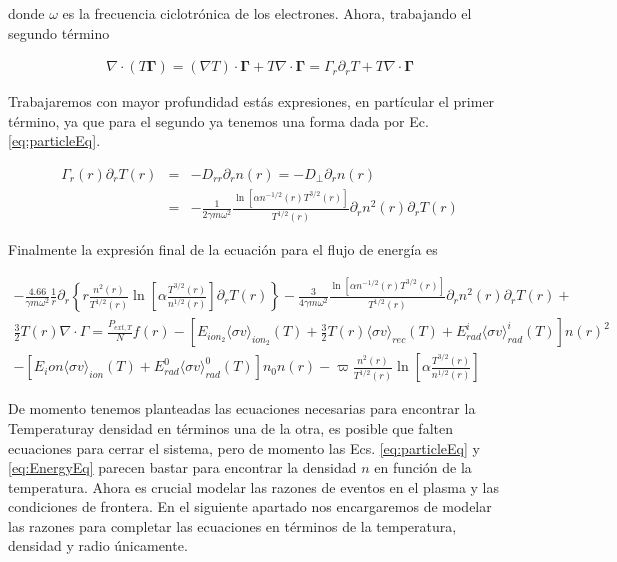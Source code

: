 donde $\omega$ es la frecuencia ciclotr\'onica de los electrones. Ahora, trabajando el segundo t\'ermino

\begin{eqnarray}
  \nabla\cdot(T\pmb{\Gamma}) = (\nabla T) \cdot \pmb{\Gamma} + T\nabla\cdot\pmb{\Gamma} = \Gamma_r\partial_r T + T\nabla\cdot{\pmb{\Gamma}}
\end{eqnarray}

Trabajaremos con mayor profundidad est\'as expresiones, en part\'icular el primer t\'ermino, ya que para el segundo ya tenemos una forma dada por Ec. \eqref{eq:particleEq}. 

\begin{eqnarray}
  \Gamma_r(r)\partial_rT(r) &=& -D_{rr}\partial_r n(r) = -D_\perp\partial_r n(r) \nonumber\\
                            &=& -\frac{1}{2\gamma m\omega^2}\frac{\ln\left[\alpha n^{-1/2}(r)T^{3/2}(r)\right]}{T^{1/2}(r)}\partial_r n^2(r)\partial_r T(r)
\end{eqnarray}

Finalmente la expresi\'on final de la ecuaci\'on para el flujo de energ\'ia es

\begin{eqnarray}
 -\frac{4.66}{\gamma m\omega^2}\frac{1}{r}\partial_r\left\{r \frac{n^2(r)}{T^{1/2}(r)}\ln\left[\alpha \frac{T^{3/2}(r)}{n^{1/2}(r)}\right] \partial_r T(r)\right\} - \frac{3}{4\gamma m\omega^2}\frac{\ln\left[\alpha n^{-1/2}(r)T^{3/2}(r)\right]}{T^{1/2}(r)}\partial_r n^2(r)\partial_r T(r) \nonumber + \nonumber\\
 \frac{3}{2}T(r)\nabla\cdot\Gamma =  \frac{P_{ext,T}}{N}f(r) -  [E_{ion_2}\langle\sigma v\rangle_{ion_2}(T) + \frac{3}{2}T(r)\langle\sigma v\rangle_{rec}(T) + E_{rad}^i\langle\sigma v\rangle_{rad}^i(T)]n(r)^2 \nonumber \\ - [E_ion\langle\sigma v\rangle_{ion}(T)+ E_{rad}^0\langle\sigma v\rangle_{rad}^0(T)]n_0n(r) - \varpi\frac{n^2(r)}{T^{1/2}(r)}\ln\left[\alpha \frac{T^{3/2}(r)}{n^{1/2}(r)}\right]\label{eq:EnergyEq}
\end{eqnarray}

De momento tenemos planteadas las ecuaciones necesarias para encontrar la Temperaturay densidad en t\'erminos una de la otra, es posible que falten ecuaciones para cerrar el sistema, pero de momento las Ecs. \eqref{eq:particleEq} y \eqref{eq:EnergyEq} parecen bastar para encontrar la densidad $n$ en funci\'on de la temperatura. Ahora es crucial modelar las razones de eventos en el plasma y las condiciones de frontera. En el siguiente apartado nos encargaremos de modelar las razones para completar las ecuaciones en t\'erminos de la temperatura, densidad y radio \'unicamente.
